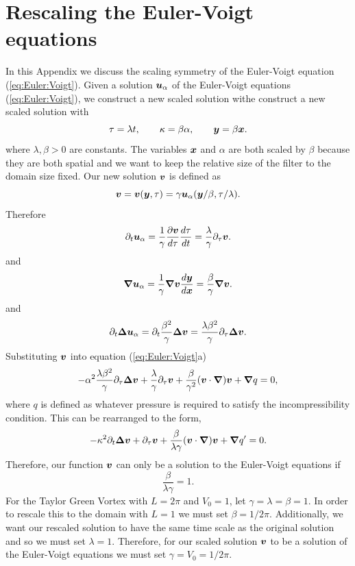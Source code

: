 \chapter{Rescaling the Euler-Voigt equations}
\label{app:time:scale:euler:voigt}
In this Appendix we discuss the scaling symmetry of the Euler-Voigt equation (\ref{eq:Euler:Voigt}). Given a solution $\boldsymbol u_\alpha$ of the Euler-Voigt equations (\ref{eq:Euler:Voigt}), we construct a new scaled solution withe construct a new scaled solution with
$$\tau = \lambda t, \qquad \kappa = \beta\alpha, \qquad \boldsymbol y = \beta\boldsymbol x.$$ 
where $\lambda, \beta > 0$ are constants. The variables $\boldsymbol x$ and $\alpha$ are both scaled by $\beta$ because they are both spatial and we want to keep the relative size of the filter to the domain size fixed. Our new solution $\boldsymbol v$ is defined as
$$\boldsymbol v = \boldsymbol v(\boldsymbol y,\tau) = \gamma \boldsymbol u_\alpha(\boldsymbol y/\beta, \tau/\lambda).$$
Therefore
$$\partial_t \boldsymbol u_\alpha = \frac{1}{\gamma}\frac{\partial \boldsymbol v}{d\tau}\frac{d\tau}{dt} = \frac{\lambda}{\gamma} \partial_\tau \boldsymbol v.$$
and
$${\boldsymbol \nabla} \boldsymbol u_\alpha = \frac{1}{\gamma}{\boldsymbol \nabla} \boldsymbol v \frac{d\boldsymbol y}{d\boldsymbol x} = \frac{\beta}{\gamma}{\boldsymbol \nabla} \boldsymbol v.$$
and
$$\partial_t {\boldsymbol \Delta} \boldsymbol u_\alpha = \partial_t \frac{\beta^2}{\gamma}{\boldsymbol \Delta} \boldsymbol v = \frac{\lambda \beta^2}{\gamma}\partial_\tau {\boldsymbol \Delta} \boldsymbol v.$$
Substituting $\boldsymbol v$ into equation (\ref{eq:Euler:Voigt}a)
$$-\alpha^2\frac{\lambda \beta^2}{\gamma}\partial_\tau {\boldsymbol \Delta} \boldsymbol v + \frac{\lambda}{\gamma} \partial_\tau \boldsymbol v + \frac{\beta}{\gamma^2}(\boldsymbol v\cdot{\boldsymbol \nabla})\boldsymbol v + {\boldsymbol \nabla} q = 0,$$
where $q$ is defined as whatever pressure is required to satisfy the incompressibility condition. This can be rearranged to the form,
$$-\kappa^2\partial_t {\boldsymbol \Delta} \boldsymbol v + \partial_\tau \boldsymbol v + \frac{\beta}{\lambda\gamma}(\boldsymbol v\cdot{\boldsymbol \nabla})\boldsymbol v + {\boldsymbol \nabla} q' = 0.$$
Therefore, our function $\boldsymbol v$ can only be a solution to the Euler-Voigt equations if
$$\frac{\beta}{\lambda\gamma} = 1.$$
For the Taylor Green Vortex with $L = 2\pi$ and $V_0 = 1$, let $\gamma = \lambda = \beta = 1.$
In order to rescale this to the domain with $L=1$ we must set $\beta = 1/2\pi$. Additionally, we want our rescaled solution to have the same time scale as the original solution and so we must set $\lambda = 1$. Therefore, for our scaled solution $\boldsymbol v$ to be a solution of the Euler-Voigt equations we must set $\gamma = V_0 = 1/2\pi$. 